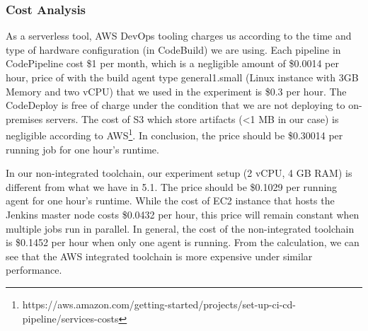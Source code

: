 \subsubsection{Cost Analysis}
 As a serverless tool, AWS DevOps tooling charges us according to the time and type of hardware configuration (in CodeBuild) we are using.
  Each pipeline in CodePipeline cost \$1 per month, which is a negligible amount of \$0.0014 per hour, price of with the build agent type general1.small (Linux instance with 3GB Memory and two vCPU) that we used in the experiment is \$0.3 per hour. The CodeDeploy is free of charge under the condition that we are not deploying to on-premises servers. The cost of S3 which store artifacts (<1 MB in our case) is negligible according to AWS\footnote{https://aws.amazon.com/getting-started/projects/set-up-ci-cd-pipeline/services-costs}. In conclusion, the price should be \$0.30014 per running job for one hour's runtime.
  \par
  In our non-integrated toolchain, our experiment setup (2 vCPU, 4 GB RAM) is different from what we have in 5.1. The price should be \$0.1029 per running agent for one hour's runtime. While the cost of EC2 instance that hosts the Jenkins master node costs \$0.0432 per hour, this price will remain constant when multiple jobs run in parallel. In general, the cost of the non-integrated toolchain is \$0.1452 per hour when only one agent is running.
From the calculation, we can see that the AWS integrated toolchain is more expensive under similar performance.
